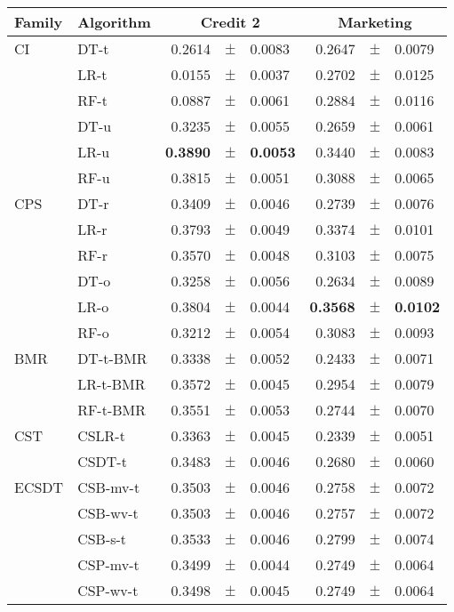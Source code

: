 {\begin{table}[!t]
     \centering
    \footnotesize
    \begin{tabular}{l l r@{\hskip 0in}c@{\hskip 0in}l r@{\hskip 0in}c@{\hskip 0in}l  } %
    \hline
    \bf{Family} & \bf{Algorithm} &  \multicolumn{3}{c}{\bf{Credit 2}} 
& \multicolumn{3}{c}{\bf{Marketing}} \\ 
      \hline
CI&DT-t &  0.2614 &$\pm$& 0.0083 & 0.2647 &$\pm$& 0.0079\\ 
&LR-t & 0.0155 &$\pm$& 0.0037 & 0.2702 &$\pm$& 0.0125\\ 
&RF-t &  0.0887 &$\pm$&0.0061 & 0.2884 &$\pm$& 0.0116\\ 
&DT-u &  0.3235 &$\pm$&0.0055 & 0.2659 &$\pm$& 0.0061\\ 
&LR-u &  \bf{0.3890} &\bf{$\pm$}& \bf{0.0053} & 0.3440 &$\pm$& 0.0083\\ 
&RF-u & 0.3815 &$\pm$&0.0051 & 0.3088 &$\pm$& 0.0065\\ 
\hline 
CPS&DT-r &0.3409 &$\pm$&0.0046 & 0.2739 &$\pm$& 0.0076\\ 
&LR-r &  0.3793 &$\pm$& 0.0049 & 0.3374 &$\pm$& 0.0101\\ 
&RF-r & 0.3570 &$\pm$& 0.0048 & 0.3103 &$\pm$& 0.0075\\ 
&DT-o & 0.3258 &$\pm$& 0.0056 & 0.2634 &$\pm$& 0.0089\\ 
&LR-o & 0.3804 &$\pm$& 0.0044 & \bf{0.3568} &\bf{$\pm$}& \bf{0.0102}\\ 
&RF-o & 0.3212 &$\pm$& 0.0054 & 0.3083 &$\pm$& 0.0093\\ 
\hline 
BMR&DT-t-BMR & 0.3338 &$\pm$& 0.0052 & 0.2433 &$\pm$& 0.0071\\ 
&LR-t-BMR &  0.3572 &$\pm$&0.0045 & 0.2954 &$\pm$& 0.0079\\ 
&RF-t-BMR &  0.3551 &$\pm$&0.0053 & 0.2744 &$\pm$& 0.0070\\ 
\hline 
CST&CSLR-t & 0.3363 &$\pm$&0.0045 & 0.2339 &$\pm$& 0.0051\\ 
&CSDT-t & 0.3483 &$\pm$& 0.0046 & 0.2680 &$\pm$& 0.0060\\ 
\hline 
ECSDT&CSB-mv-t & 0.3503 &$\pm$& 0.0046 & 0.2758 &$\pm$& 0.0072\\ 
&CSB-wv-t &  0.3503 &$\pm$&0.0046 & 0.2757 &$\pm$& 0.0072\\ 
&CSB-s-t &  0.3533 &$\pm$& 0.0046 & 0.2799 &$\pm$& 0.0074\\ 
&CSP-mv-t &0.3499 &$\pm$& 0.0044 & 0.2749 &$\pm$& 0.0064\\ 
&CSP-wv-t & 0.3498 &$\pm$&0.0045 & 0.2749 &$\pm$& 0.0064\\ 

\end{tabular}
\end{table}}
